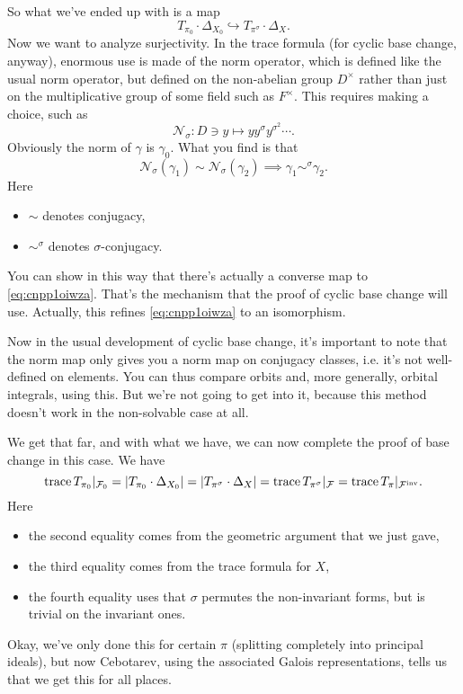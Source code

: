 \documentclass[reqno]{amsart} 
\begin{document}
So what we've ended up with is a map
\begin{equation}\label{eq:cnpp1oiwza}
  T_{\pi_0} \cdot \Delta_{X_0} \hookrightarrow T_{\pi^\sigma} \cdot \Delta_X.
\end{equation}
Now we want to analyze surjectivity.  In the trace formula (for cyclic base change, anyway), enormous use is made of the norm operator, which is defined like the usual norm operator, but defined on the non-abelian group $D^\times$ rather than just on the multiplicative group of some field such as $F^\times$.  This requires making a choice, such as
\begin{equation*}
  \mathcal{N}_\sigma : D \ni y \mapsto y y^{\sigma} y^{\sigma^2} \dotsb.
\end{equation*}
Obviously the norm of $\gamma$ is $\gamma_0$.  What you find is that
\begin{equation*}
  \mathcal{N}_\sigma(\gamma_1) \sim \mathcal{N}_\sigma(\gamma_2) \implies \gamma_1 \sim^\sigma \gamma_2.
\end{equation*}
Here
\begin{itemize}
\item $\sim$ denotes conjugacy,
\item $\sim^\sigma$ denotes $\sigma$-conjugacy.
\end{itemize}
You can show in this way that there's actually a converse map to \eqref{eq:cnpp1oiwza}.  That's the mechanism that the proof of cyclic base change will use.  Actually, this refines \eqref{eq:cnpp1oiwza} to an isomorphism.

Now in the usual development of cyclic base change, it's important to note that the norm map only gives you a norm map on conjugacy classes, i.e. it's not well-defined on elements.  You can thus compare orbits and, more generally, orbital integrals, using this.  But we're not going to get into it, because this method doesn't work in the non-solvable case at all.

We get that far, and with what we have, we can now complete the proof of base change in this case.  We have
\begin{equation*}
  \operatorname{trace} T_{\pi_0} |_{\mathcal{F}_0} =
  \lvert T_{\pi_0} \cdot \Delta_{X_0} \rvert
  =
  \lvert T_{\pi^\sigma} \cdot \Delta_X \rvert
  =
  \operatorname{trace} T_{\pi^\sigma} |_{\mathcal{F}}
  = \operatorname{trace} T_\pi |_{\mathcal{F}^{\mathrm{inv}}}.
\end{equation*}
Here
\begin{itemize}
\item the second equality comes from the geometric argument that we just gave,
\item the third equality comes from the trace formula for $X$, 
\item the fourth equality uses that $\sigma$ permutes the non-invariant forms, but is trivial on the invariant ones.
\end{itemize}
Okay, we've only done this for certain $\pi$ (splitting completely into principal ideals), but now Cebotarev, using the associated Galois representations, tells us that we get this for all places.
\end{document}
